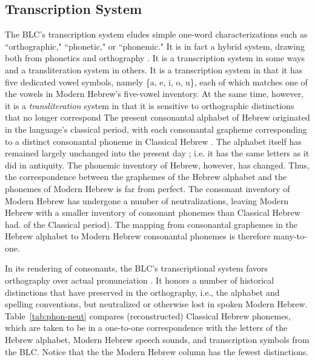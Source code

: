 \subsection{Transcription System}
\label{sec:transcription}
The \ac{BLC}'s transcription system eludes simple one-word 
characterizations such as ``orthographic,"
``phonetic," or ``phonemic." It is in fact a hybrid system, drawing
both from phonetics and orthography \citep{albert-et-al:2013}. 
It is a transcription system in some ways and a transliteration 
system in others. It is a transcription system in that it has 
five dedicated vowel symbols, 
namely \{a, e, i, o, u\}, each of which matches one of the 
vowels in Modern Hebrew's five-vowel inventory. 
At the same time, however, 
it is a \emph{transliteration} system in that it is sensitive to 
orthographic distinctions that no longer correspond
The present consonantal alphabet of Hebrew originated in the 
language's classical period, with each 
consonantal grapheme corresponding to 
a distinct consonantal phoneme in Classical Hebrew \citep{rendsburg:1997}. The alphabet itself
has remained largely unchanged 
into the present day \citep{weinberg:1975, ravid:2005}; i.e. it has the same letters as it 
did in antiquity. The phonemic inventory 
of Hebrew, however, has changed. Thus, the correspondence 
between the graphemes of the Hebrew
alphabet and the phonemes of Modern Hebrew is far from perfect. 
The consonant inventory of Modern Hebrew
has undergone a number of neutralizations, leaving 
Modern Hebrew with a smaller inventory of consonant phonemes than
Classical Hebrew had. %
of the Classical period). 
The mapping 
from consonantal graphemes in the Hebrew alphabet
to Modern Hebrew consonantal phonemes is therefore many-to-one.


In its rendering of consonants, the \ac{BLC}'s transcriptional system 
favors orthography over actual pronunciation \citep{albert-et-al:2013}.
It honors a number of historical distinctions that have preserved in the orthography, 
i.e., the alphabet and 
spelling conventions, but neutralized or otherwise lost in spoken Modern Hebrew. 
Table~\ref{tab:phon-neut} compares 
(reconstructed) Classical Hebrew phonemes, which are taken to be in a one-to-one 
correspondence with the letters of 
the Hebrew alphabet, Modern Hebrew speech sounds, and transcription symbols 
from the \ac{BLC}. Notice that the
the Modern Hebrew column has the fewest distinctions.

